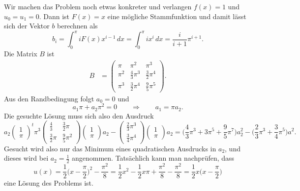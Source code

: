 Wir machen das Problem noch etwas konkreter und verlangen $f(x)=1$
und $u_0=u_1=0$.
Dann ist $F(x)=x$ eine mögliche Stammfunktion und damit lässt sich
der Vektor $b$ berechnen als
\[
b_i
=
\int_0^\pi i F(x) x^{i-1}\,dx
=
\int_0^\pi i x^i\,dx
=
\frac{i}{i+1}
\pi^{i+1}.
\]
Die Matrix $B$ ist
\begin{align*}
B&=\begin{pmatrix}
\pi   & \pi^2            & \pi^3            \\
\pi^2 & \frac{4}{3}\pi^3 & \frac{3}{2}\pi^4 \\
\pi^3 & \frac{3}{2}\pi^4 & \frac{9}{5}\pi^5
\end{pmatrix}.
\end{align*}
Aus den Randbedingung folgt $a_0=0$ und
\[
a_1\pi+a_2\pi^2=0
\qquad\Rightarrow\qquad
a_1 = \pi a_2.
\]
Die gesuchte Lösung muss sich also den Ausdruck
\[
a_2
\begin{pmatrix}
1\\\pi
\end{pmatrix}^t
\pi^3
\begin{pmatrix}
\frac43   &\frac32\pi\\
\frac32\pi&\frac95\pi^2
\end{pmatrix}
\begin{pmatrix}
1\\\pi
\end{pmatrix}
a_2
-
\begin{pmatrix}
\frac23\pi^3\\\frac34\pi^4
\end{pmatrix}
\begin{pmatrix}
1\\\pi
\end{pmatrix}
a_2
=
\biggl(
\frac43\pi^3+3\pi^5 +\frac95\pi^7
\biggr)
a_2^2
-\biggl(\frac23\pi^3+\frac34\pi^5\biggr)
a^2.
\]
Gesucht wird also nur das Minimum eines quadratischen Ausdrucks 
in $a_2$, und dieses wird bei $a_2=\frac12$ angenommen.
Tatsächlich kann man nachprüfen, dass
\[
u(x)
=
\frac12\biggl(x-\frac{\pi}2\biggr)^2 -\frac{\pi^2}8
=
\frac12x^2 -\frac12 x\pi +\frac{\pi^2}8 - \frac{\pi^2}8
=
\frac12x\biggl(x-\frac{\pi}2\biggr)
\]
eine Lösung des Problems ist.


